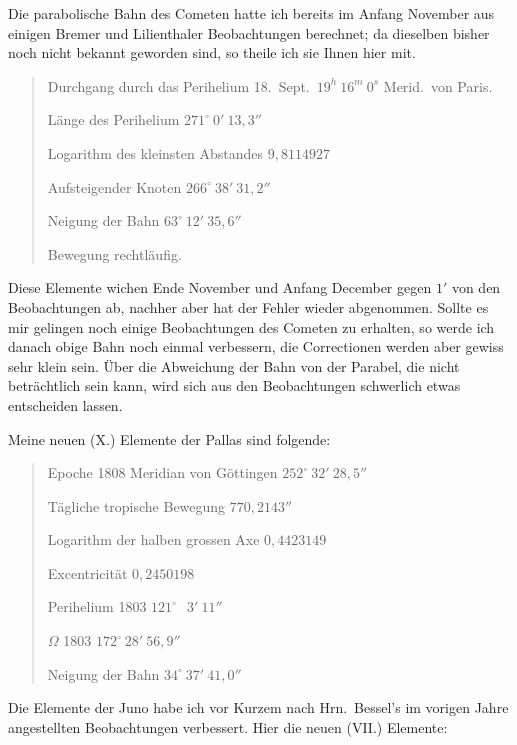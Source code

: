 \documentclass[12pt,a4paper]{book}
\begin{document}
Die parabolische Bahn des Cometen hatte ich bereits im Anfang November aus einigen Bremer und Lilienthaler Beobachtungen berechnet; da dieselben bisher noch nicht bekannt geworden sind, so theile ich sie Ihnen hier mit.

\begin{quote}
Durchgang durch das Perihelium 18.~Sept.\ $19^{h}\ 16^{m}\ 0^{s}$ Merid.\ von Paris.

L\"ange des Perihelium \dotfill $271^{\circ}\ 0'\ 13{,}3''$

Logarithm des kleinsten Abstandes \dotfill $9{,}8114927$

Aufsteigender Knoten \dotfill $266^{\circ}\ 38'\ 31{,}2''$

Neigung der Bahn \dotfill $63^{\circ}\ 12'\ 35{,}6''$

Bewegung rechtl\"aufig.
\end{quote}

Diese Elemente wichen Ende November und Anfang December gegen $1'$ von den Beobachtungen ab, nachher aber hat der Fehler wieder abgenommen. Sollte es mir gelingen noch einige Beobachtungen des Cometen zu erhalten, so werde ich danach obige Bahn noch einmal verbessern, die Correctionen werden aber gewiss sehr klein sein. \"Uber die Abweichung der Bahn von der Parabel, die nicht betr\"achtlich sein kann, wird sich aus den Beobachtungen schwerlich etwas entscheiden lassen.

Meine neuen (X.) Elemente der Pallas sind folgende:

\begin{quote}
Epoche 1808 Meridian von G\"ottingen \dotfill $252^{\circ}\ 32'\ 28{,}5''$

T\"agliche tropische Bewegung \dotfill $770{,}2143''$

Logarithm der halben grossen Axe \dotfill $0{,}4423149$

Excentricit\"at \dotfill $0{,}2450198$

Perihelium 1803 \dotfill $121^{\circ}\ \phantom{0}3'\ 11''$

$\Omega$ 1803 \dotfill $172^{\circ}\ 28'\ 56{,}9''$

Neigung der Bahn \dotfill $34^{\circ}\ 37'\ 41{,}0''$
\end{quote}

Die Elemente der Juno habe ich vor Kurzem nach Hrn.~Bessel's im vorigen Jahre angestellten Beobachtungen verbessert. Hier die neuen (VII.) Elemente:
\end{document}
